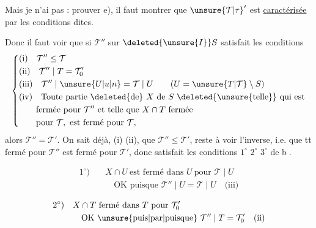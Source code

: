 Mais je n'ai pas   : prouver e), il faut montrer que ${\unsure{\mathcal{T}|\tau}}'$  est \uline{caractérisée} par les conditions dites.

Donc il faut voir que si $\mathcal{T}''$ sur $\deleted{\unsure{I}}S$ satisfait les conditions
\[
\left\{\begin{aligned}
&\text{(i)}\quad\mathcal{T}''\leq\mathcal{T}\\
&\text{(ii)}\quad\mathcal{T}''\mid T=\mathcal{T}'_0\\
&\text{(iii)}\quad\mathcal{T}''\mid\unsure{U|u|n}=\mathcal{T}\mid U\qquad (U=\unsure{T|\mathcal{T}}\setminus S)\\
&\text{(iv)}\quad\text{Toute partie \deleted{de} }X\text{ de }S\ \text{\deleted{\unsure{telle}} qui est}\\
&\qquad\text{fermée pour }\mathcal{T}''\text{ et telle que }X\cap T\text{ fermée}\\
&\qquad\text{pour }\mathcal{T},\ \text{est fermé pour }\mathcal{T},
\end{aligned}\right.
\]
alors $\mathcal{T}''=\mathcal{T}'$. On sait déjà,  (i) (ii), que $\mathcal{T}''\leq\mathcal{T}'$, reste à voir l'inverse, i.e. que tt fermé pour $\mathcal{T}''$ est fermé pour $\mathcal{T}'$, donc satisfait les conditions $1^\circ$ $2^\circ$ $3^\circ$ de  \textcircled{b}.

\[
\begin{aligned}
1^\circ)&\quad X\cap U\ \text{est fermé dans }U\ \text{pour }\mathcal{T}\mid U\\
&\qquad\text{OK puisque }\mathcal{T}''\mid U=\mathcal{T}\mid U\quad\text{(iii)}
\end{aligned}
\]

\[
\begin{aligned}
2^\circ)&\quad X\cap T\ \text{fermé dans }T\ \text{pour }\mathcal{T}'_0\\
&\qquad\text{OK \unsure{puis|par|puisque} }\mathcal{T}''\mid T=\mathcal{T}'_0\quad\text{(ii)}
\end{aligned}
\]

